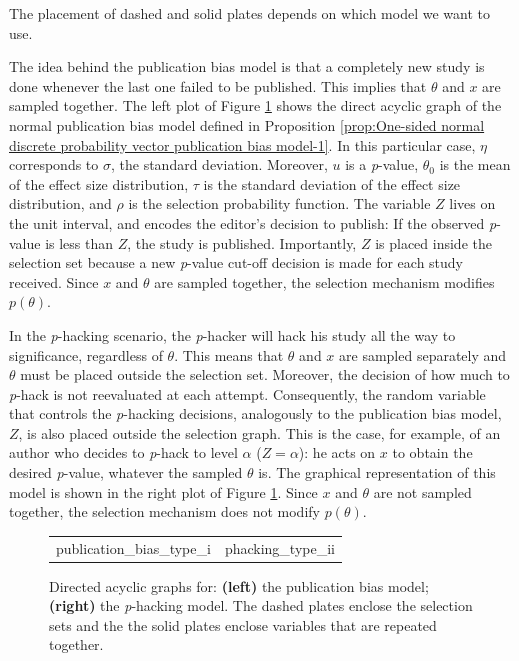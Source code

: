 \documentclass{article}
\theoremstyle{plain}
\theoremstyle{definition}
\begin{document}
The placement of dashed and solid plates depends on which model we want to use.

The idea behind the publication bias model is that a completely new study is done whenever the last one failed to be published. This implies that $\theta$ and $x$ are sampled together. The left plot of Figure \ref{fig:Plate notation, publication bias and p-hacking} shows the direct acyclic graph of the normal publication bias model defined in Proposition \ref{prop:One-sided normal discrete probability vector publication bias model-1}. In this particular case, $\eta$ corresponds to $\sigma$, the standard deviation. Moreover, $u$ is a \textit{p}-value, $\theta_{0}$ is the mean of the effect size distribution, $\tau$ is the standard deviation of the effect size distribution, and $\rho$ is the selection probability function. The variable $Z$ lives on the unit interval, and encodes the editor's decision to publish: If the observed \textit{p}-value is less than $Z$, the study is published. Importantly, $Z$ is placed inside the selection set because a new \textit{p}-value cut-off decision is made for each study received. Since $x$ and $\theta$ are sampled together, the selection mechanism modifies $p(\theta)$.%

In the \textit{p}-hacking scenario, the \textit{p}-hacker will hack his study all the way to significance, regardless of $\theta$. This means that $\theta$ and $x$ are sampled separately and $\theta$ must be placed outside the selection set. Moreover, the decision of how much to \textit{p}-hack is not reevaluated at each attempt. Consequently, the random variable that controls the \textit{p}-hacking decisions, analogously to the publication bias model, $Z$, is also placed outside the selection graph. This is the case, for example, of an author who decides to \textit{p}-hack to level $\alpha$ ($Z = \alpha$): he acts on $x$ to obtain the desired \textit{p}-value, whatever the sampled $\theta$ is. The graphical representation of this model is shown in the right plot of Figure \ref{fig:Plate notation, publication bias and p-hacking}. Since $x$ and $\theta$ are not sampled together, the selection mechanism does not modify $p(\theta)$.

\begin{figure}
\begin{center}     
 \begin{tabular}{cc}    
  {publication_bias_type_i} &     
  {phacking_type_ii}
 \end{tabular} 
\end{center}
\caption{\label{fig:Plate notation, publication bias and p-hacking} Directed acyclic graphs for: {\bf (left)}
the publication bias model; {\bf (right)} the \textit{p}-hacking model. The dashed plates enclose the selection sets and the the solid plates enclose variables that are repeated together.}
\end{figure}
\end{document}
